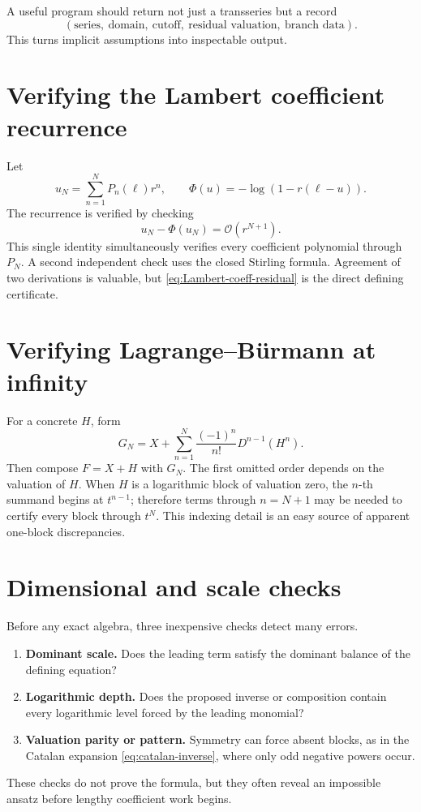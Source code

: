 \documentclass[11pt,openany]{book}
\theoremstyle{definition}
\theoremstyle{plain}
\theoremstyle{remark}
\newcommand{\bigO}{\mathcal{O}}
\begin{document}
\begin{algorithmicbox}
A useful program should return not just a transseries but a record
\[
 (\text{series},\ \text{domain},\ \text{cutoff},\ \text{residual valuation},\ \text{branch data}).
\]
This turns implicit assumptions into inspectable output.
\end{algorithmicbox}

\section{Verifying the Lambert coefficient recurrence}
Let
\[
 u_N=\sum_{n=1}^{N}P_n(\ell)r^n,
 \qquad
 \Phi(u)=-\log(1-r(\ell-u)).
\]
The recurrence is verified by checking
\begin{equation}\label{eq:Lambert-coeff-residual}
 u_N-\Phi(u_N)=\bigO(r^{N+1}).
\end{equation}
This single identity simultaneously verifies every coefficient polynomial through \(P_N\). A second independent check uses the closed Stirling formula. Agreement of two derivations is valuable, but \cref{eq:Lambert-coeff-residual} is the direct defining certificate.

\section{Verifying Lagrange--B\"urmann at infinity}
For a concrete \(H\), form
\[
 G_N=X+\sum_{n=1}^{N}\frac{(-1)^n}{n!}D^{n-1}(H^n).
\]
Then compose \(F=X+H\) with \(G_N\). The first omitted order depends on the valuation of \(H\). When \(H\) is a logarithmic block of valuation zero, the \(n\)-th summand begins at \(t^{n-1}\); therefore terms through \(n=N+1\) may be needed to certify every block through \(t^N\). This indexing detail is an easy source of apparent one-block discrepancies.

\section{Dimensional and scale checks}
Before any exact algebra, three inexpensive checks detect many errors.
\begin{enumerate}
\item \textbf{Dominant scale.} Does the leading term satisfy the dominant balance of the defining equation?
\item \textbf{Logarithmic depth.} Does the proposed inverse or composition contain every logarithmic level forced by the leading monomial?
\item \textbf{Valuation parity or pattern.} Symmetry can force absent blocks, as in the Catalan expansion \cref{eq:catalan-inverse}, where only odd negative powers occur.
\end{enumerate}
These checks do not prove the formula, but they often reveal an impossible ansatz before lengthy coefficient work begins.
\end{document}
